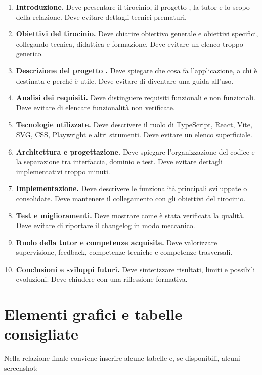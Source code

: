 \begin{enumerate}
    \item \textbf{Introduzione.} Deve presentare il tirocinio, il progetto \builder, la tutor e lo scopo della relazione. Deve evitare dettagli tecnici prematuri.
    \item \textbf{Obiettivi del tirocinio.} Deve chiarire obiettivo generale e obiettivi specifici, collegando tecnica, didattica e formazione. Deve evitare un elenco troppo generico.
    \item \textbf{Descrizione del progetto \builder.} Deve spiegare che cosa fa l'applicazione, a chi è destinata e perché è utile. Deve evitare di diventare una guida all'uso.
    \item \textbf{Analisi dei requisiti.} Deve distinguere requisiti funzionali e non funzionali. Deve evitare di elencare funzionalità non verificate.
    \item \textbf{Tecnologie utilizzate.} Deve descrivere il ruolo di TypeScript, React, Vite, SVG, CSS, Playwright e altri strumenti. Deve evitare un elenco superficiale.
    \item \textbf{Architettura e progettazione.} Deve spiegare l'organizzazione del codice e la separazione tra interfaccia, dominio e test. Deve evitare dettagli implementativi troppo minuti.
    \item \textbf{Implementazione.} Deve descrivere le funzionalità principali sviluppate o consolidate. Deve mantenere il collegamento con gli obiettivi del tirocinio.
    \item \textbf{Test e miglioramenti.} Deve mostrare come è stata verificata la qualità. Deve evitare di riportare il changelog in modo meccanico.
    \item \textbf{Ruolo della tutor e competenze acquisite.} Deve valorizzare supervisione, feedback, competenze tecniche e competenze trasversali.
    \item \textbf{Conclusioni e sviluppi futuri.} Deve sintetizzare risultati, limiti e possibili evoluzioni. Deve chiudere con una riflessione formativa.
\end{enumerate}

\section{Elementi grafici e tabelle consigliate}

Nella relazione finale conviene inserire alcune tabelle e, se disponibili, alcuni screenshot:


